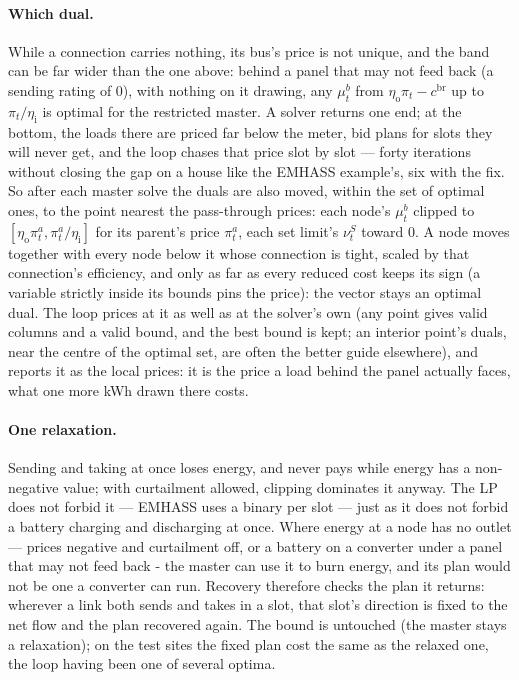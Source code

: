 \documentclass[11pt,a4paper]{article}
\newcommand{\cbr}{c^{\mathrm{br}}}
\begin{document}
\paragraph{Which dual.} While a connection carries nothing, its bus's price is not
unique, and the band can be far wider than the one above: behind a panel that
may not feed back (a sending rating of $0$), with nothing on it drawing, any
$\mu^b_t$ from $\eta_{\mathrm o}\pi_t - \cbr$ up to $\pi_t/\eta_{\mathrm i}$ is
optimal for the restricted master. A solver returns one end; at the bottom, the
loads there are priced far below the meter, bid plans for slots they will
never get, and the loop chases that price slot by slot --- forty iterations
without closing the gap on a house like the EMHASS example's, six with the
fix. So after each master solve the duals are also moved, within the set
of optimal ones, to the point nearest the pass-through prices: each node's
$\mu^b_t$ clipped to $[\eta_{\mathrm o}\pi^{a}_t, \pi^{a}_t/\eta_{\mathrm i}]$ for
its parent's price $\pi^a_t$, each set limit's $\nu^S_t$ toward $0$. A node moves
together with every node below it whose connection is tight, scaled by that
connection's efficiency, and only as far as every reduced cost keeps its sign
(a variable strictly inside its bounds pins the price): the vector stays an
optimal dual. The loop prices at it as well as at the solver's own (any
point gives valid columns and a valid bound, and the best bound is kept; an
interior point's duals, near the centre of the optimal set, are often the
better guide elsewhere), and reports it as the local prices: it is the price a
load behind the panel actually faces, what one more kWh drawn there costs.

\paragraph{One relaxation.} Sending and taking at once loses energy, and never
pays while energy has a non-negative value; with curtailment allowed, clipping
dominates it anyway. The LP does not forbid it --- EMHASS uses a binary
per slot --- just as it does not forbid a battery charging and discharging at
once. Where energy at a node has no outlet --- prices negative and curtailment off,
or a battery on a converter under a panel that may not feed back - the master
can use it to burn energy, and its plan would not be one a converter can run.
Recovery therefore checks the plan it returns: wherever a link both sends and
takes in a slot, that slot's direction is fixed to the net flow and the plan
recovered again. The bound is untouched (the master stays a relaxation); on the
test sites the fixed plan cost the same as the relaxed one, the loop having
been one of several optima.
\end{document}
